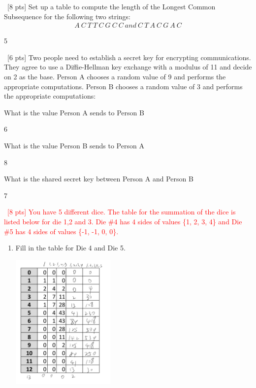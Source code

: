 \documentclass[12pt]{article}
\newenvironment{sol}[1][Solution]{\begin{trivlist}\item[\hskip\labelsep {\bfseries #1:}]}{\end{trivlist}}
\begin{document}
\begin{enumerate}
    
    \item \ [8 pts] Set up a table to compute the length of the Longest Common Subsequence for the following two strings:
    \begin{align*}
        A \ C \ T \ T \ C \ G \ C \ C \ and \ C \ T \ A \ C \ G \ A \ C
    \end{align*}
    \begin{sol}
    5
    \end{sol}

    \item \ [6 pts] Two people need to establish a secret key for encrypting communications. They agree to use a Diffie-Hellman key exchange with a modulus of 11 and decide on 2 as the base. Person A chooses a random value of 9 and performs the appropriate computations. Person B chooses a random value of 3 and performs the appropriate computations:
    \begin{enumerate}
        \item What is the value Person A sends to Person B
        \begin{sol}
            6
        \end{sol}
        \item What is the value Person B sends to Person A
        \begin{sol}
            8
        \end{sol}
        \item What is the shared secret key between Person A and Person B
        \begin{sol}
            7
        \end{sol}
    \end{enumerate}
    \item \ \textcolor{red}{[8 pts] You have 5 different dice. The table for the summation of the dice is listed below for die 1,2 and 3. Die \#4 has 4 sides of values \{1, 2, 3, 4\} and Die \#5 has 4 sides of values \{-1, -1, 0, 0\}.}
    \begin{enumerate}
        \item Fill in the table for Die 4 and Die 5.
                \begin{center}
    \includegraphics[width=0.4\textwidth]{p5.jpeg}

\end{center}
\end{enumerate}
\end{enumerate}
\end{document}
